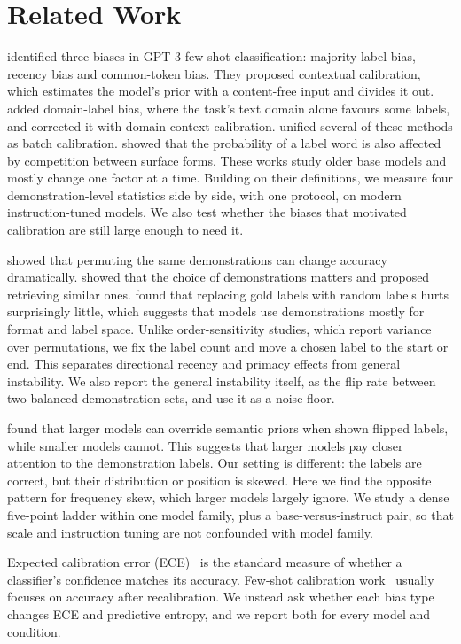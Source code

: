 \section{Related Work}
\label{sec:related}

\citet{zhao2021calibrate} identified three biases in GPT-3 few-shot classification: majority-label bias, recency bias and common-token bias. They proposed contextual calibration, which estimates the model's prior with a content-free input and divides it out. \citet{fei2023mitigating} added domain-label bias, where the task's text domain alone favours some labels, and corrected it with domain-context calibration. \citet{zhou2024batch} unified several of these methods as batch calibration. \citet{holtzman2021surface} showed that the probability of a label word is also affected by competition between surface forms. These works study older base models and mostly change one factor at a time. Building on their definitions, we measure four demonstration-level statistics side by side, with one protocol, on modern instruction-tuned models. We also test whether the biases that motivated calibration are still large enough to need it.

\citet{lu2022fantastically} showed that permuting the same demonstrations can change accuracy dramatically. \citet{liu2022makes} showed that the choice of demonstrations matters and proposed retrieving similar ones. \citet{min2022rethinking} found that replacing gold labels with random labels hurts surprisingly little, which suggests that models use demonstrations mostly for format and label space. Unlike order-sensitivity studies, which report variance over permutations, we fix the label count and move a chosen label to the start or end. This separates directional recency and primacy effects from general instability. We also report the general instability itself, as the flip rate between two balanced demonstration sets, and use it as a noise floor.

\citet{wei2023larger} found that larger models can override semantic priors when shown flipped labels, while smaller models cannot. This suggests that larger models pay closer attention to the demonstration labels. Our setting is different: the labels are correct, but their distribution or position is skewed. Here we find the opposite pattern for frequency skew, which larger models largely ignore. We study a dense five-point ladder within one model family, plus a base-versus-instruct pair, so that scale and instruction tuning are not confounded with model family.

Expected calibration error (ECE)~\citep{guo2017calibration} is the standard measure of whether a classifier's confidence matches its accuracy. Few-shot calibration work~\citep{zhao2021calibrate,zhou2024batch} usually focuses on accuracy after recalibration. We instead ask whether each bias type changes ECE and predictive entropy, and we report both for every model and condition.
